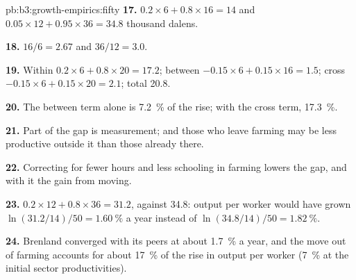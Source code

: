 \begin{solution}{pb:b3:growth-empirics:fifty}
\textbf{17.} $0.2 \times 6 + 0.8 \times 16 = 14$ and $0.05 \times 12 + 0.95 \times 36 = 34.8$ thousand dalens.

\textbf{18.} $16/6 = 2.67$ and $36/12 = 3.0$.

\textbf{19.} Within $0.2 \times 6 + 0.8 \times 20 = 17.2$; between $-0.15 \times 6 + 0.15 \times 16 = 1.5$; cross $-0.15 \times 6 + 0.15 \times 20 = 2.1$; total 20.8.

\textbf{20.} The between term alone is 7.2~\% of the rise; with the cross term, 17.3~\%.

\textbf{21.} Part of the gap is measurement; and those who leave farming may be less
productive outside it than those already there.

\textbf{22.} Correcting for fewer hours and less schooling in farming lowers the gap,
and with it the gain from moving.

\textbf{23.} $0.2 \times 12 + 0.8 \times 36 = 31.2$, against 34.8: output per worker would have grown $\ln(31.2/14)/50 = 1.60~\%$ a year instead of
$\ln(34.8/14)/50 = 1.82~\%$.

\textbf{24.} Brenland converged with its peers at about 1.7~\% a year, and the move out of farming
accounts for about 17~\% of the rise in output per worker (7~\% at the initial sector productivities).
\end{solution}
